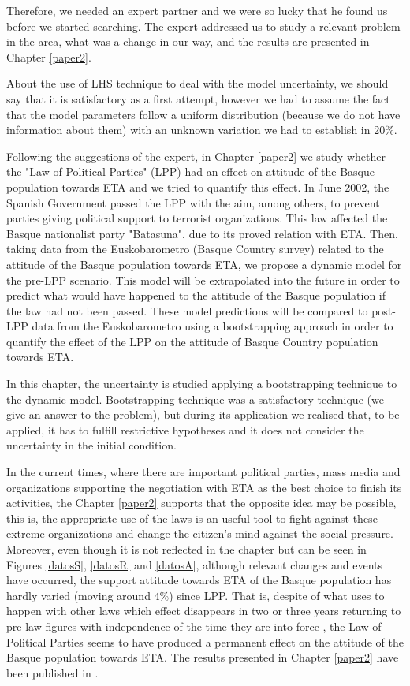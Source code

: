 Therefore, we needed an expert partner and we were so lucky that he found us before we started searching. The expert addressed us to study a relevant problem in the area, what was a change in our way, and the results are presented in Chapter \ref{paper2}.

About the use of LHS technique to deal with the model uncertainty, we should say that it is satisfactory as a first attempt, however we had to assume the fact that the model parameters follow a uniform distribution (because we do not have information about them) with an unknown variation we had to establish in $20\%$.  

Following the suggestions of the expert, in Chapter \ref{paper2} we study whether the "Law of Political Parties" (LPP) had an effect on attitude of the Basque population towards ETA and we tried to quantify this effect. In June 2002, the Spanish Government passed the LPP with the aim, among others, to prevent parties giving political support to terrorist organizations. This law affected the Basque nationalist party "Batasuna", due to its proved relation with ETA. Then, taking data from the Euskobarometro (Basque Country survey) related to the attitude of the Basque population towards ETA, we propose a dynamic model for the pre-LPP scenario. This model will be extrapolated into the future in order to predict what would have happened to the attitude of the Basque population if the law had not been passed. These model predictions will be compared to post-LPP data from the Euskobarometro using a bootstrapping approach in order to quantify the effect of the LPP on the attitude of Basque Country population towards ETA. 

In this chapter, the uncertainty is studied applying a bootstrapping technique to the dynamic model. Bootstrapping technique was a satisfactory technique (we give an answer to the problem), but during its application we realised that, to be applied, it has to fulfill restrictive hypotheses and it does not consider the uncertainty in the initial condition.

In the current times, where there are important political parties, mass media and organizations supporting the negotiation with ETA as the best choice to finish its activities, the Chapter \ref{paper2} supports that the opposite idea may be possible, this is, the appropriate use of the laws is an useful tool to fight against these extreme organizations and change the citizen's mind against the social pressure. Moreover, even though it is not reflected in the chapter but can be seen in Figures \ref{datosS}, \ref{datosR} and \ref{datosA}, although relevant changes and events have occurred, the support attitude towards ETA of the Basque population has hardly varied (moving around $4\%$) since LPP. That is, despite of what uses to happen with other laws which effect disappears in two or three years returning to pre-law figures with independence of the time they are into force \cite{tabaco}, the Law of Political Parties seems to have produced a permanent effect on the attitude of the Basque population towards ETA. The results presented in Chapter \ref{paper2} have been published in \cite{NOS}.

